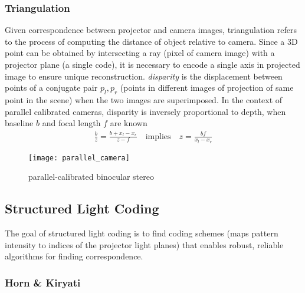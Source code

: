 \documentclass[../writeup.tex]{subfiles}
\begin{document}
\subsubsection{Triangulation}

Given correspondence between projector and camera images, triangulation refers to the process of computing the distance of object relative to camera. Since a 3D point can be obtained by intersecting a ray (pixel of camera image) with a projector plane (a single code), it is necessary to encode a single axis in projected image to ensure unique reconstruction. \textit{disparity} is the displacement between points of a conjugate pair $p_l,p_r$ (points in different images of projection of same point in the scene) when the two images are superimposed. In the context of parallel calibrated cameras, disparity is inversely proportional to depth, when baseline $b$ and focal length $f$ are known
\begin{align*}
    \frac{b}{z} = \frac{b + x_l - x_r}{z-f}
    \quad\text{implies}\quad
    z = \frac{bf}{x_l-x_r}
\end{align*}
\begin{figure}[h!]
    \begin{center}
        \texttt{[image: parallel\_camera]}
        \caption{parallel-calibrated binocular stereo}
    \end{center}
\end{figure}

\subsection{Structured Light Coding}

The goal of structured light coding is to find coding schemes (maps pattern intensity to indices of the projector light planes) that enables robust, reliable algorithms for finding correspondence.


\subsubsection{Horn \& Kiryati} 
\end{document}
